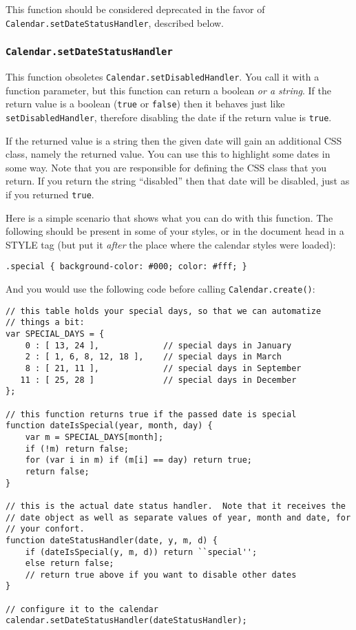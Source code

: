 \documentclass[a4paper,twoside,10pt]{dynadoc}
\begin{document}
This function should be considered deprecated in the favor of
\texttt{Calendar.setDateStatusHandler}, described below.

\subsubsection{\texttt{Calendar.setDateStatusHandler}}\label{sec:Calendar.setDateStatusHandler}

This function obsoletes \texttt{Calendar.setDisabledHandler}.  You call it with
a function parameter, but this function can return a boolean
\emph{or a string}.  If the return value is a boolean (\texttt{true} or
\texttt{false}) then it behaves just like \texttt{setDisabledHandler},
therefore disabling the date if the return value is \texttt{true}.

If the returned value is a string then the given date will gain an additional
CSS class, namely the returned value.  You can use this to highlight some dates
in some way.  Note that you are responsible for defining the CSS class that you
return.  If you return the string ``disabled'' then that date will be disabled,
just as if you returned \texttt{true}.

Here is a simple scenario that shows what you can do with this function.  The
following should be present in some of your styles, or in the document head in
a STYLE tag (but put it \emph{after} the place where the calendar styles were
loaded):

\begin{verbatim}
.special { background-color: #000; color: #fff; }
\end{verbatim}

And you would use the following code before calling \texttt{Calendar.create()}:

\begin{verbatim}
// this table holds your special days, so that we can automatize
// things a bit:
var SPECIAL_DAYS = {
    0 : [ 13, 24 ],             // special days in January
    2 : [ 1, 6, 8, 12, 18 ],    // special days in March
    8 : [ 21, 11 ],             // special days in September
   11 : [ 25, 28 ]              // special days in December
};

// this function returns true if the passed date is special
function dateIsSpecial(year, month, day) {
    var m = SPECIAL_DAYS[month];
    if (!m) return false;
    for (var i in m) if (m[i] == day) return true;
    return false;
}

// this is the actual date status handler.  Note that it receives the
// date object as well as separate values of year, month and date, for
// your confort.
function dateStatusHandler(date, y, m, d) {
    if (dateIsSpecial(y, m, d)) return ``special'';
    else return false;
    // return true above if you want to disable other dates
}

// configure it to the calendar
calendar.setDateStatusHandler(dateStatusHandler);
\end{verbatim}
\end{document}
